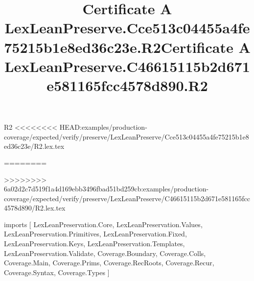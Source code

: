 \begin{lexlean}{R2}
<<<<<<<< HEAD:examples/production-coverage/expected/verify/preserve/LexLeanPreserve/Cce513c04455a4fe75215b1e8ed36c23e/R2.lex.tex
\title{Certificate A LexLeanPreserve.Cce513c04455a4fe75215b1e8ed36c23e.R2}
========
\title{Certificate A LexLeanPreserve.C46615115b2d671e581165fcc4578d890.R2}
>>>>>>>> 6a02d2c7d519f1a4d169ebb3496fbad51bd259cb:examples/production-coverage/expected/verify/preserve/LexLeanPreserve/C46615115b2d671e581165fcc4578d890/R2.lex.tex
\begin{coremodule}
imports [
  LexLeanPreservation.Core,
  LexLeanPreservation.Values,
  LexLeanPreservation.Primitives,
  LexLeanPreservation.Fixed,
  LexLeanPreservation.Keys,
  LexLeanPreservation.Templates,
  LexLeanPreservation.Validate,
  Coverage.Boundary,
  Coverage.Colls,
  Coverage.Main,
  Coverage.Prims,
  Coverage.RecRoots,
  Coverage.Recur,
  Coverage.Syntax,
  Coverage.Types
]


\end{coremodule}
\end{lexlean}
